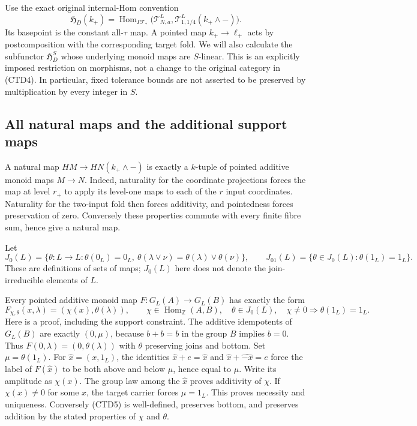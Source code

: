 Use the exact original internal-Hom convention
\begin{equation}\tag{CTD4}
\mathfrak H_D(k_+)
=\operatorname{Hom}_{\Gamma\mathcal T_*}
 \bigl(\mathcal T^L_{N,a},
       \mathcal T^L_{1,1/4}(k_+\wedge-)\bigr).
\end{equation}
Its basepoint is the constant all-$\tau$ map. A pointed map
$k_+\to\ell_+$ acts by postcomposition with the corresponding
target fold. We will also calculate the subfunctor
$\mathfrak H_D^S$ whose underlying monoid maps are $S$-linear.
This is an explicitly imposed restriction on morphisms, not a
change to the original category in (CTD4). In particular, fixed
tolerance bounds are not asserted to be preserved by multiplication
by every integer in $S$.

\subsection{All natural maps and the additional support maps}

A natural map $HM\to HN(k_+\wedge-)$ is exactly a $k$-tuple of
pointed additive monoid maps $M\to N$. Indeed, naturality for the
coordinate projections forces the map at level $r_+$ to apply its
level-one maps to each of the $r$ input coordinates. Naturality
for the two-input fold then forces additivity, and pointedness
forces preservation of zero. Conversely these properties commute
with every finite fibre sum, hence give a natural map.

Let
\[
J_0(L)=\{\theta:L\to L:\theta(0_L)=0_L,\
 \theta(\lambda\vee\nu)=\theta(\lambda)\vee\theta(\nu)\},
\qquad
J_{01}(L)=\{\theta\in J_0(L):\theta(1_L)=1_L\}.
\]
These are definitions of sets of maps; $J_0(L)$ here does not
denote the join-irreducible elements of $L$.

Every pointed additive monoid map $F:G_L(A)\to G_L(B)$ has
exactly the form
\begin{equation}\tag{CTD5}
F_{\chi,\theta}(x,\lambda)
  =(\chi(x),\theta(\lambda)),\qquad
\chi\in\operatorname{Hom}_{\mathbb Z}(A,B),\quad
\theta\in J_0(L),\quad
\chi\ne0\Longrightarrow\theta(1_L)=1_L.
\end{equation}
Here is a proof, including the support constraint. The additive
idempotents of $G_L(B)$ are exactly $(0,\mu)$, because $b+b=b$
in the group $B$ implies $b=0$. Thus $F(0,\lambda)=(0,\theta(\lambda))$
with $\theta$ preserving joins and bottom. Set $\mu=\theta(1_L)$.
For $\widehat x=(x,1_L)$, the identities
$\widehat x+e=\widehat x$ and $\widehat x+\widehat{-x}=e$
force the label of $F(\widehat x)$ to be both above and below
$\mu$, hence equal to $\mu$. Write its amplitude as $\chi(x)$.
The group law among the $\widehat x$ proves additivity of $\chi$.
If $\chi(x)\ne0$ for some $x$, the target carrier forces $\mu=1_L$.
This proves necessity and uniqueness. Conversely (CTD5) is
well-defined, preserves bottom, and preserves addition by the
stated properties of $\chi$ and $\theta$.

